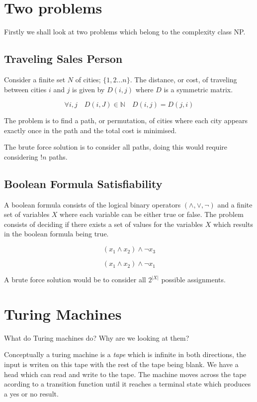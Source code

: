 \documentclass{article}
\theoremstyle{definition}
\begin{document}
\section{Two problems}
Firstly we shall look at two problems which belong to the complexity class NP.

\subsection{Traveling Sales Person}
Consider a finite set $N$ of cities; $\{1, 2 \dots n\}$. The distance, or cost,
of traveling between cities $i$ and $j$ is given by $D(i,j)$ where $D$
is a symmetric matrix.

$$\forall i, j\quad D(i,J) \in \mathbb{N}\quad D(i,j) = D(j,i)$$

The problem is to find a path, or permutation, of
cities where each city appears exactly once in the path and the total
cost is minimised.

The brute force solution is to consider all paths, doing this would require
considering $!n$ paths.

\subsection{Boolean Formula Satisfiability}
A boolean formula consists of the logical binary operators $(\land, \lor, \neg)$
and a finite set of variables $X$ where each variable can be either true or false.
The problem consists of deciding if there exists a set of values for the variables $X$
which results in the boolean formula being true.

$$(x_1 \land x_2) \land \neg x_3$$

$$(x_1 \land x_2) \land \neg x_1$$

A brute force solution would be to consider all $2^{|X|}$ possible assignments.

\section{Turing Machines}
What do Turing machines do? Why are we looking at them?

Conceptually a turing machine is a \textit{tape} which is infinite in both directions,
the input is writen on this tape with the rest of the tape being blank. We have a head
which can read and write to the tape. The machine moves across the tape acording to
a transition function until it reaches a terminal state which produces a yes or no result.
\end{document}

